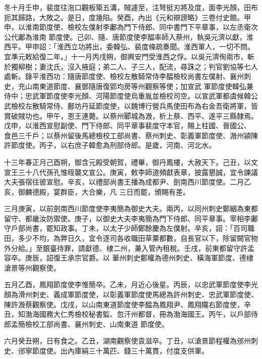 \begin{pinyinscope}
 冬十月壬申，裴度往沲口觀板築五溝，賊遽至，注弩挺刃將及度，面李光顏，田布扼其歸路，大敗之。是日，度幾陷。癸酉，內出《元和辯謗略》三卷付史館。甲申，以淮南節度使、檢校左僕射李鄘為門下侍郎、同中書門下平章事，以左丞衛次公代鄘為淮南
 節度使。己卯、隨、唐節度使李醖率師入蔡州，執吳元濟以獻，淮西平。甲申詔：「淮西立功將出，委韓弘、裴度條疏奏聞。淮西軍人，一切不問。宜準元敕給復二年。」十一月丙戌朔，御興安門受淮西之俘。以吳元濟徇兩市，斬於獨柳樹；妻沈氏，沒入掖庭；弟二人、子三人，配流，尋誅之；判官劉協等七人處斬。錄平淮西功：隨唐節度使、檢校左散騎常侍李醖檢校尚書左僕射、襄州刺史，充山南東道節度、襄鄧隨唐復郢均房等州觀察等使；加宣武
 軍節度使韓弘兼侍中；忠武軍節度使李光顏、河陽節度使烏重胤並檢校司空。以宣武軍都虞候韓公武檢校左散騎常侍、鄜坊丹延節度使，以魏博行營兵馬使田布為右金吾衛將軍，皆賞破賊功也。甲午，恩王連薨。以蔡州郾城為溵，析上蔡、西平、遂平三縣隸焉。戊申，以淮西宣慰副使、門下侍郎、同平章事裴度守本官，賜上柱國、晉國公、
 食邑三千戶；以蔡州留後馬總檢校工部尚書、蔡州刺史、彰義軍節度使、溵州潁陳許節度使。丙子，以右庶子韓愈為刑部侍郎。是歲，河南、河北水。



 十三年春正月己酉朔，御含元殿受朝賀，禮畢，御丹鳳樓，大赦天下。己丑，以文宣王三十八代孫孔惟晊襲文宣公。庚寅，敕李師道頻獻表章，披露懇誠，宜令諫議大夫張宿往彼宣慰。辛亥，以禮部尚書王播為成都尹、劍南西川節度使。二月乙亥，御麟德殿，宴群臣，大合樂，凡
 三日而罷，頒賜有差。



 三月庚寅，以前劍南西川節度使李夷簡為御史大夫。兩丙，以同州刺史鄭絪為東都留守、都畿汝防禦使。庚子，以御史大夫李夷簡為門下侍郎、同平章事。宰相李鄘守戶部尚書，罷知政事。丁未，以太子少師鄭餘慶為左僕射。辛亥，詔：「百司職田，多少不均，為弊日久，宜令逐司各收職田草粟都數，自長官以下，除留闕官物外分給。」至銀臺待罪，請獻德、棣二州，兼入管內租稅。壬戌，前東都留守許孟容卒。庚辰，詔復王承宗官爵。以
 華州刺史鄭權為德州刺史、橫海軍節度、德棣滄景等州觀察使。



 五月乙酉，鳳翔節度使李惟簡卒。乙未，月近心後星。丙辰，以忠武軍節度使李光顏為滑州刺史、義成軍節度使，以彰義軍節度使馬總為許州刺史、忠武軍節度使、陳許溵蔡觀察使。戊戌，以山南東道節度使李醖為鳳翔尹、鳳翔隴右節度使，辛丑，知渤海國務大仁秀檢校秘書監、忽汗州都督，冊為渤海國王。丙午，以戶部侍郎孟簡檢校工部尚書、襄州刺史、山南東道
 節度使。



 六月癸丑朔，日有食之。乙丑，湖南觀察使袁滋卒。丁丑，以滄景節程權為邠州刺史、邠寧節度使。出內庫絹三十萬匹、錢三十萬貫，付度支供軍。




\end{pinyinscope}
